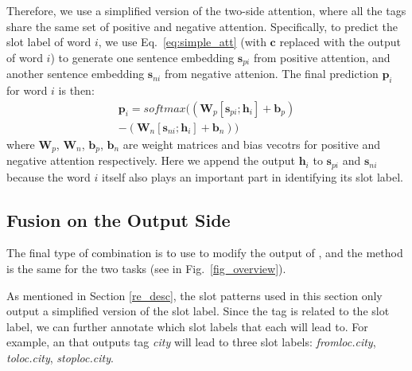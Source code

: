 Therefore, we use a simplified version of the two-side attention, where all the tags share the same set of positive and negative attention.
Specifically, to predict the slot label of word $i$, we use Eq.~\ref{eq:simple_att} (with $\textbf{c}$ replaced with the \BLSTM output of word $i$) to generate one sentence embedding $\textbf{s}_{pi}$ from positive attention, and another sentence embedding $\textbf{s}_{ni}$ from negative attenion.
The final prediction $\textbf{p}_i$ for word $i$ is then:
\begin{equation}
\begin{split}
\textbf{p}_i = softmax((\textbf{W}_p [\textbf{s}_{pi}; \textbf{h}_i] + \textbf{b}_p) \\- (\textbf{W}_n [\textbf{s}_{ni}; \textbf{h}_i] + \textbf{b}_n))
\end{split}
\end{equation}
where $\textbf{W}_{p}$, $\textbf{W}_{n}$, $\textbf{b}_{p}$, $\textbf{b}_{n}$ are weight matrices and bias vecotrs for positive and negative attention respectively. Here we append the \BLSTM output $\textbf{h}_i$ to $\textbf{s}_{pi}$ and $\textbf{s}_{ni}$ because the word $i$ itself also plays an important part in identifying its slot label.

\subsection{Fusion on the Output Side}
\label{fusion_with_output}
The final type of combination is to use \RE to modify the output of \NN, and the method is the same for the two tasks (see  in Fig.~\ref{fig_overview}).


As mentioned in Section \ref{re_desc}, the slot \RE patterns used in this section only output a simplified version of the slot label.
Since the \RE tag is related to the slot label, we can further annotate which slot labels that each \RE will lead to.
For example, an \RE that outputs tag \emph{city} will lead to three slot labels: \emph{fromloc.city}, \emph{toloc.city}, \emph{stoploc.city}.

